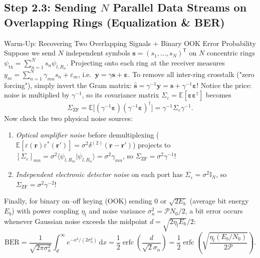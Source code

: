 \documentclass[10pt,letterpaper]{article}
\newcommand{\braket}[2]{\langle #1 | #2 \rangle}
\newcommand{\dd}{\mathrm{d}}
\numberwithin{equation}{section}
\begin{document}
\subsection{Step 2.3: Sending $N$ Parallel Data Streams on Overlapping Rings (Equalization \& BER)}

\begin{foundationbox}{Warm-Up: Recovering Two Overlapping Signals + Binary OOK Error Probability}
Suppose we send $N$ independent symbols $\mathbf{s} = (s_1,\dots,s_N)^{\mathsf{T}}$ on $N$ concentric rings $\psi_{\mathrm{tx}} = \sum_{n=1}^N s_n \psi_{l,R_n}$. Projecting onto each ring at the receiver measures $y_m = \sum_{n=1}^N \gamma_{mn} s_n + \varepsilon_m$, i.e.\ $\mathbf{y} = \gamma\mathbf{s} + \boldsymbol{\varepsilon}$. To remove all inter-ring crosstalk ("zero forcing"), simply invert the Gram matrix: $\hat{\mathbf{s}} = \gamma^{-1}\mathbf{y} = \mathbf{s} + \gamma^{-1}\boldsymbol{\varepsilon}$! Notice the price: noise is multiplied by $\gamma^{-1}$, so its covariance matrix $\Sigma_\varepsilon = \mathbb{E}[\boldsymbol{\varepsilon}\boldsymbol{\varepsilon}^\dagger]$ becomes
\[
  \Sigma_{\mathrm{ZF}} = \mathbb{E}\bigl[(\gamma^{-1}\boldsymbol{\varepsilon})(\gamma^{-1}\boldsymbol{\varepsilon})^\dagger\bigr] = \gamma^{-1}\Sigma_\varepsilon \gamma^{-1}.
\]
Now check the two physical noise sources:
\begin{enumerate}[leftmargin=1.4em,itemsep=1pt,topsep=1pt]
  \item \emph{Optical amplifier noise} before demultiplexing ($\mathbb{E}[\varepsilon(\mathbf{r})\varepsilon^*(\mathbf{r}')] = \sigma^2\delta^{(2)}(\mathbf{r}-\mathbf{r}')$) projects to $[\Sigma_\varepsilon]_{mn} = \sigma^2\braket{\psi_{l,R_m}}{\psi_{l,R_n}} = \sigma^2\gamma_{mn}$, so $\Sigma_{\mathrm{ZF}} = \sigma^2\gamma^{-1}$!
  \item \emph{Independent electronic detector noise} on each port has $\Sigma_\varepsilon = \sigma^2\mathbb{I}_N$, so $\Sigma_{\mathrm{ZF}} = \sigma^2\gamma^{-2}$!
\end{enumerate}
Finally, for binary on--off keying (OOK) sending $0$ or $\sqrt{2E_b}$ (average bit energy $E_b$) with power coupling $\eta_l$ and noise variance $\sigma_n^2 = \mathcal{P} N_0/2$, a bit error occurs whenever Gaussian noise exceeds the midpoint $d = \sqrt{2\eta_l E_b}/2$:
\[
  \mathrm{BER} = \frac{1}{\sqrt{2\pi\sigma_n^2}}\int_d^\infty e^{-x^2/(2\sigma_n^2)}\,\dd x = \frac{1}{2}\operatorname{erfc}\!\left(\frac{d}{\sqrt{2}\sigma_n}\right) = \frac{1}{2}\operatorname{erfc}\!\left(\sqrt{\frac{\eta_l(E_b/N_0)}{2\mathcal{P}}}\right).
\]
\end{foundationbox}
\end{document}
